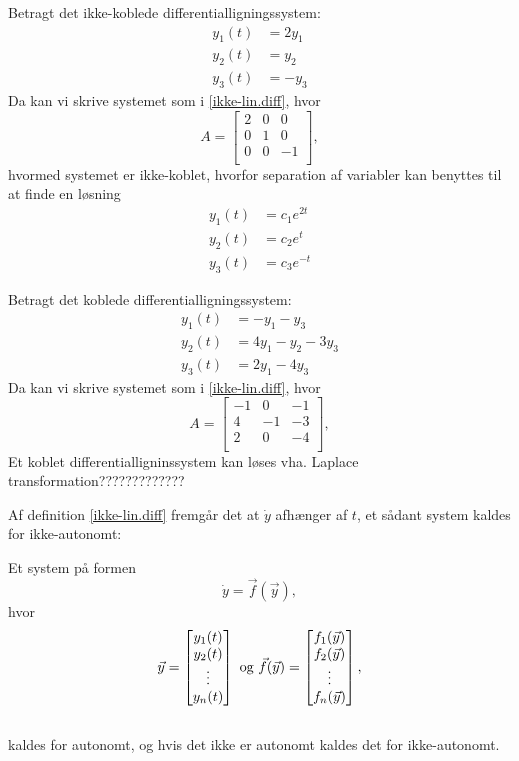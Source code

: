 \begin{Example}
\textnormal{ \hfill \break
Betragt det ikke-koblede differentialligningssystem:}
\hfill \break
\begin{align*}
    y_1(t) &= 2y_1\\
    y_2(t) &= y_2\\
    y_3(t) &= -y_3
\end{align*}
\textnormal{Da kan vi skrive systemet som i \ref{ikke-lin.diff}, hvor}
\hfill \break
\[ A =
\begin{bmatrix}
2 & 0 & 0\\
0 & 1 & 0\\
0 & 0 & -1\\
\end{bmatrix},
\]
\textnormal{hvormed systemet er ikke-koblet, hvorfor separation af variabler kan benyttes til at finde en løsning}
\begin{align*}
    y_1(t) &= c_1e^{2t}\\
    y_2(t) &= c_2e^t\\
    y_3(t) &= c_3e^{-t}
\end{align*}

\end{Example}

\begin{Example}\textnormal{
\hfill \break
Betragt det koblede differentialligningssystem:}
\begin{align*}
    y_1(t) &= -y_1-y_3\\
    y_2(t) &= 4y_1-y_2-3y_3\\
    y_3(t) &= 2y_1-4y_3
\end{align*}
\textnormal{Da kan vi skrive systemet som i \ref{ikke-lin.diff}, hvor}
\hfill \break
\[ A =
\begin{bmatrix}
-1 & 0 & -1\\
4 & -1 & -3\\
2 & 0 & -4\\
\end{bmatrix},
\]
\textnormal{Et koblet differentialligninssystem kan løses vha. Laplace transformation?????????????} 
\end{Example}

Af definition \ref{ikke-lin.diff} fremgår det at $\dot{y}$ afhænger af $t$, et sådant system kaldes for ikke-autonomt:
\begin{definition}[Autonomitet]
Et system på formen
$$\dot{y}=\vec{f}(\vec{y}),$$
hvor $$\vec{y}=
\begin{bmatrix}
y_1(t) \\
y_2(t) \\
\vdots \\
y_n(t)
\end{bmatrix} \ \textnormal{og} \ \vec{f}(\vec{y})=\begin{bmatrix}
f_1(\vec{y}) \\
f_2(\vec{y}) \\
\vdots \\
f_n(\vec{y})
\end{bmatrix},$$ \\
kaldes for autonomt, og hvis det ikke er autonomt kaldes det for ikke-autonomt.
\end{definition}

